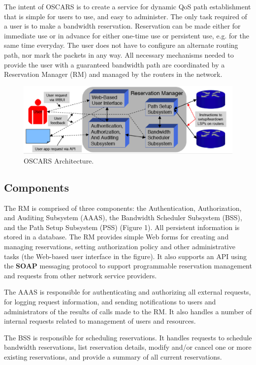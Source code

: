 \documentclass[conference]{IEEEtran}
\begin{document}
The intent of OSCARS is to create a service for dynamic QoS path establishment
that is simple for users to use, and easy to administer.  The only task 
required of a user is to make a bandwidth reservation.  Reservation can be made 
either for immediate use or in advance for either one-time use or persistent use, 
e.g. for the same time everyday. The user does not have 
to configure an alternate routing path, nor mark the packets in any way.  All 
necessary mechanisms needed to provide the user with a guaranteed bandwidth 
path are coordinated by a Reservation Manager (RM) and 
managed by the routers in the network.

\begin{figure}
 \centering 
   \includegraphics[scale=0.3]{pict1.eps}
   \caption{OSCARS Architecture.}
 \label{fig:oscars_arch}
\end{figure}

\subsection{Components}

The RM is comprised of three components:  the 
Authentication, Authorization, and Auditing Subsystem (AAAS), 
the Bandwidth Scheduler Subsystem (BSS), and the Path 
Setup Subsystem (PSS) (Figure 1). All persistent information is 
stored in a database.  
The RM provides simple Web forms for creating and managing reservations, 
setting authorization policy and other administrative tasks (the Web-based
user interface in the figure).
It also supports an API using the \textbf{SOAP} messaging protocol to support programmable 
reservation management and requests from other network service providers.

The AAAS is responsible for authenticating and authorizing all external 
requests, for logging request information, and sending notifications to
users and administrators of the results of calls made to the RM.  It also
handles a number of internal requests related to management of users 
and resources.

The BSS is responsible for scheduling reservations.  It handles
requests to schedule bandwidth reservations, list reservation details,
modify and/or cancel one or more existing reservations, and provide a summary
of all current reservations.
\end{document}

